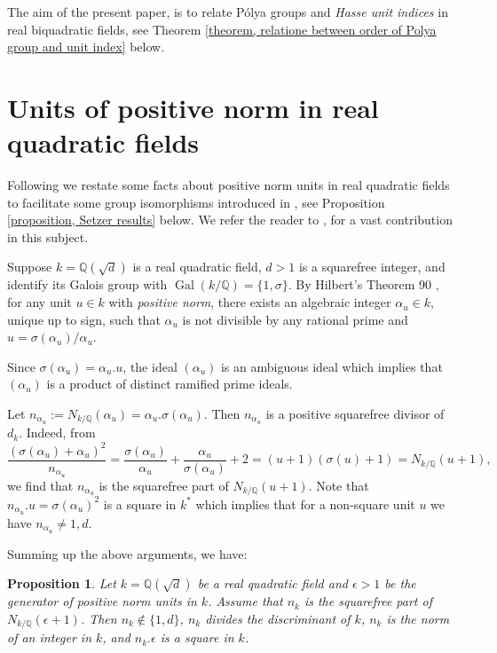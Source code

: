 \documentclass{jams-l}
\newtheorem{proposition}[theorem]{Proposition}
\theoremstyle{definition}
\theoremstyle{remark}
\numberwithin{equation}{section}
\DeclareMathOperator{\Gal}{Gal}
\begin{document}
The aim of the present paper, is to relate P\'olya groups and \textit{Hasse unit indices} in real biquadratic fields, see Theorem \eqref{theorem, relatione between order of Polya group and unit index} below. 
\fi 





\iffalse 
\section{Units of positive norm in real quadratic fields} \label{section, units with positive norm in quadratic}
Following \cite{MaarefJNT2021} we restate some facts about positive norm units in real quadratic fields to facilitate some group isomorphisms introduced in \cite{Bennett}, see Proposition \eqref{proposition, Setzer results} below. We refer the reader to \cite{Mazur}, for a vast contribution in this subject. 

Suppose $k=\mathbb{Q}(\sqrt{d})$ is a real quadratic field, $d>1$ is a squarefree integer, and identify its Galois group with $\Gal(k/\mathbb{Q})=\{1,\sigma \}$.
By Hilbert's Theorem 90 \cite{Hilbert's book}, for any unit $u\in k$ with \textit{positive norm},  there exists an algebraic integer $\alpha_{u} \in k$, unique up to sign, such that $\alpha_{u}$ is not divisible by any rational prime and
 $u=\sigma(\alpha_{u})/\alpha_{u}$. 

Since $\sigma(\alpha_{u})=\alpha_{u}.u$, the ideal $(\alpha_{u})$ is an ambiguous ideal which implies that $(\alpha_{u})$ is a product of distinct ramified prime ideals. 


Let  $n_{\alpha_{u}}:=N_{k/\mathbb{Q}}(\alpha_{u})=\alpha_{u}.\sigma(\alpha_{u})$. Then $n_{\alpha_{u}}$ is a positive squarefree divisor of $d_k$. Indeed, from
\begin{equation*}
	\frac{(\sigma(\alpha_u)+\alpha_u)^2}{n_{\alpha_{u}}}=\frac{\sigma(\alpha_u)}{\alpha_u}+\frac{\alpha_u}{\sigma(\alpha_u)}+2=\left( u+1 \right) \left( \sigma(u)+1 \right)=N_{k/\mathbb{Q}}(u+1),
\end{equation*}
we find that $n_{\alpha_u}$ is the squarefree part of $N_{k/\mathbb{Q}}(u+1)$.  Note that $n_{\alpha_u} .u=\sigma(\alpha_u)^2$ is a square in $k^*$ 
which implies that for a non-square unit $u$ we have $n_{\alpha_u} \neq 1,d$. 

Summing up the above arguments, we have:

\begin{proposition} \label{proposition, properties of m_k}
	Let $k=\mathbb{Q}(\sqrt{d})$ be a real quadratic field and $\epsilon >1$ be the generator of positive norm units in $k$. Assume that $n_k$ is the squarefree part of $N_{k/\mathbb{Q}}(\epsilon+1)$. Then $n_k \not \in \{ 1,d\}$, $n_k$ divides the discriminant of $k$, $n_k$ is the norm of an integer in $k$, and $n_k .\epsilon$ is a square in $k$.
\end{proposition}
\end{document}
